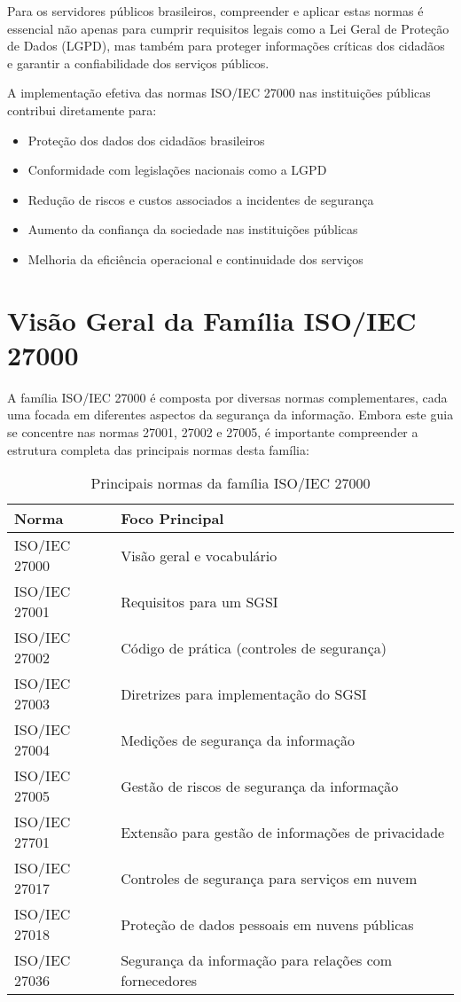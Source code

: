 \documentclass[12pt,a4paper]{report}
\begin{document}
Para os servidores públicos brasileiros, compreender e aplicar estas normas é essencial não apenas para cumprir requisitos legais como a Lei Geral de Proteção de Dados (LGPD), mas também para proteger informações críticas dos cidadãos e garantir a confiabilidade dos serviços públicos.

\begin{infobox}
A implementação efetiva das normas ISO/IEC 27000 nas instituições públicas contribui diretamente para:

\begin{itemize}
  \item Proteção dos dados dos cidadãos brasileiros
  \item Conformidade com legislações nacionais como a LGPD
  \item Redução de riscos e custos associados a incidentes de segurança
  \item Aumento da confiança da sociedade nas instituições públicas
  \item Melhoria da eficiência operacional e continuidade dos serviços
\end{itemize}
\end{infobox}

\section{Visão Geral da Família ISO/IEC 27000}

A família ISO/IEC 27000 é composta por diversas normas complementares, cada uma focada em diferentes aspectos da segurança da informação. Embora este guia se concentre nas normas 27001, 27002 e 27005, é importante compreender a estrutura completa das principais normas desta família:

\begin{table}[h]
\centering
\begin{tabular}{ll}
\toprule
\textbf{Norma} & \textbf{Foco Principal} \\
\midrule
ISO/IEC 27000 & Visão geral e vocabulário \\
ISO/IEC 27001 & Requisitos para um SGSI \\
ISO/IEC 27002 & Código de prática (controles de segurança) \\
ISO/IEC 27003 & Diretrizes para implementação do SGSI \\
ISO/IEC 27004 & Medições de segurança da informação \\
ISO/IEC 27005 & Gestão de riscos de segurança da informação \\
ISO/IEC 27701 & Extensão para gestão de informações de privacidade \\
ISO/IEC 27017 & Controles de segurança para serviços em nuvem \\
ISO/IEC 27018 & Proteção de dados pessoais em nuvens públicas \\
ISO/IEC 27036 & Segurança da informação para relações com fornecedores \\
\bottomrule
\end{tabular}
\caption{Principais normas da família ISO/IEC 27000}
\end{table}
\end{document}
